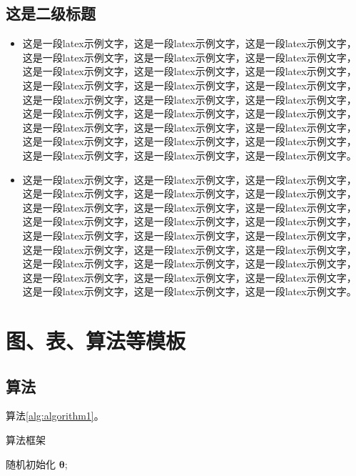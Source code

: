 \documentclass{template} %
\begin{document}
\begin{multicols}{2}
        \subsection{这是二级标题}
        \begin{itemize}
        \item 这是一段latex示例文字\cite{reddy2013polypharmacology}，这是一段latex示例文字，这是一段latex示例文字，这是一段latex示例文字，这是一段latex示例文字，这是一段latex示例文字，这是一段latex示例文字，这是一段latex示例文字，这是一段latex示例文字，这是一段latex示例文字，这是一段latex示例文字，这是一段latex示例文字，这是一段latex示例文字，这是一段latex示例文字，这是一段latex示例文字，这是一段latex示例文字，这是一段latex示例文字，这是一段latex示例文字，这是一段latex示例文字，这是一段latex示例文字，这是一段latex示例文字，这是一段latex示例文字，这是一段latex示例文字，这是一段latex示例文字，这是一段latex示例文字，这是一段latex示例文字，这是一段latex示例文字。

        \item 这是一段latex示例文字\cite{reddy2013polypharmacology}，这是一段latex示例文字，这是一段latex示例文字，这是一段latex示例文字，这是一段latex示例文字，这是一段latex示例文字，这是一段latex示例文字，这是一段latex示例文字，这是一段latex示例文字，这是一段latex示例文字，这是一段latex示例文字，这是一段latex示例文字，这是一段latex示例文字，这是一段latex示例文字，这是一段latex示例文字，这是一段latex示例文字，这是一段latex示例文字，这是一段latex示例文字，这是一段latex示例文字，这是一段latex示例文字，这是一段latex示例文字，这是一段latex示例文字，这是一段latex示例文字，这是一段latex示例文字，这是一段latex示例文字，这是一段latex示例文字，这是一段latex示例文字。
        \end{itemize}
        
    \section{图、表、算法等模板}

\subsection{算法}
算法\ref{alg:algorithm1}。

\vspace{0.5em}
\begin{algorithm}[H]
	\caption{算法框架}
	\label{alg:algorithm1}
	\BlankLine
        随机初始化 $\bm{\theta}$;
        

\end{algorithm}
\end{multicols}
\end{document}
